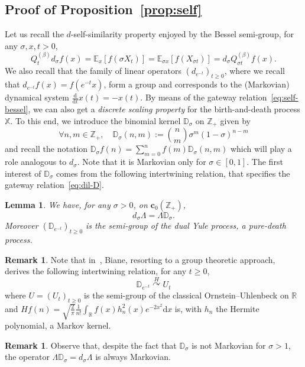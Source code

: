 \documentclass[10pt]{amsart}
\newtheorem{lemm}[theo]{Lemma}\newtheorem{prop}[theo]{Proposition}\newtheorem{coro}[theo]{Corollary}\newtheorem{conj}[theo]{Conjecture}
\theoremstyle{definition}\newtheorem{defi}[theo]{Definition}\newtheorem{rema}[theo]{Remark}\newtheorem{exam}[theo]{Example}\newtheorem{exem}[theo]{Example}\newtheorem{nota}[theo]{Notation}
\newcommand{\df}{\mathrel{:=}}
\newcommand{\cD}{{\discret{D}}}
\newcommand{\RR}{\mathbb{R}}
\newcommand{\ZZ}{\mathbb{Z}}
\newcommand{\esc}{\mathbf{c}}
\newcommand*\E{{\mathbb E}}
\newcommand*\R{{\mathbb R}}
\newcommand{\discret}[1]{\mathds{#1}}
\newcommand{\cont}[1]{{#1}}
\newcommand{\Gate}[3]{#1\stackrel{#2}{\curvearrowright}#3}
\let\oldforall\forall
\renewcommand*{\forall}{\mathrel{\oldforall}}
\newcommand*{\dd}{\mathrm{d}}
\newcommand*{\dx}{\dd x}
\newcommand*{\dt}{\dd t}
\begin{document}
\subsection{Proof of Proposition~\ref{prop:self}} Let us recall the $d$-self-similarity property enjoyed by the Bessel semi-group, for any $\sigma,x,t>0$,
\begin{equation}\label{eq:self-bessel_rec}
\cont{Q}^{(\beta)}_{t}\cont{d}_{\sigma} f(x)=\E_x[f(\sigma X_t)]=\E_{\sigma x}[f(X_{\sigma t})]=\cont{d}_{\sigma}\cont{Q}^{(\beta)}_{\sigma t}f(x).
\end{equation}
We also recall that the family of linear operators $(\cont{d}_{e^{-t}})_{t\geq 0}$, where we recall that $\cont{d}_{e^{-t}}f(x)=f(e^{-t}x)$, form a group and corresponds to the (Markovian) dynamical system $\frac{\dd}{\dt}{x(t)}=-x(t)$. By means of the gateway relation~\eqref{eq:self-bessel}, we can also get a \emph{discrete scaling property} for the birth-and-death process $\discret{X}$. To this end, we introduce the binomial kernel $\discret{D}_\sigma $ on $\ZZ_+$ given by
\[
\forall n,m\in\ZZ_+,\quad \discret{D}_\sigma (n,m)\df\binom{n}{m}\sigma^m(1-\sigma)^{n-m}
\]
and recall the notation $
\discret{D}_\sigma f(n)=\sum_{m=0}^n f(m)\discret{D}_\sigma (n,m)$ which will play a role analogous to $d_\sigma$. Note that it is Markovian only for $\sigma\in[0,1]$. The first interest of $\discret{D}_\sigma $ comes from the following intertwining relation, that specifies the gateway relation~\eqref{eq:dil-D}.
\begin{lemm}\label{lem:dLamD}
We have, for any $\sigma>0$, on $\esc_0(\ZZ_+)$,
\[
\cont{d}_{\sigma}\Lambda=\Lambda \cD_{\sigma}.
\]
Moreover $ (\cD_{e^{-t}})_{t \geq 0}$ is the semi-group of the dual Yule process, a pure-death process.
\end{lemm}
\begin{rema}
Note that in~\cite{Biane-int}, Biane, resorting to a group theoretic approach, derives the following intertwining relation, for any $t\geq 0$,
\[
\Gate{\cD_{e^{-t}}}{H}{U_t}
\]
where $U=(U_t)_{t\geq0}$ is the semi-group of the classical Ornstein--Uhlenbeck on $\RR$ and $H f(n) = \sqrt{\frac{2}{\pi}}\frac{1}{n!}\int_{\R}f(x)h^2_n(x)e^{-2x^2}\dx$ is, with $h_n$ the Hermite polynomial, a Markov kernel.
\end{rema}
\begin{rema}
Observe that, despite the fact that $\discret{D}_\sigma $ is not Markovian for $\sigma>1$, the operator $\Lambda \discret{D}_\sigma =d_\sigma\Lambda$ is always Markovian.
\end{rema}
\end{document}
